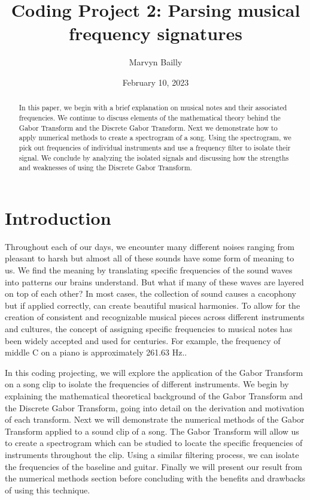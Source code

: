 \documentclass[12pt]{article}%
\begin{document}
\title{Coding Project 2:  Parsing musical frequency signatures}

\author{Marvyn Bailly}
\date{February 10, 2023}

\maketitle


\begin{abstract}
In this paper, we begin with a brief explanation on musical notes and their associated frequencies. We continue to discuss elements of the mathematical theory behind the Gabor Transform and the Discrete Gabor Transform. Next we demonstrate how to apply numerical methods to create a spectrogram of a song. Using the spectrogram, we pick out frequencies of individual instruments and use a frequency filter to isolate their signal. We conclude by analyzing the isolated signals and discussing how the strengths and weaknesses of using the Discrete Gabor Transform. 
\end{abstract}


\section{Introduction}
\label{Sec: Intro}

Throughout each of our days, we encounter many different noises ranging from pleasant to harsh but almost all of these sounds have some form of meaning to us. We find the meaning by translating specific frequencies of the sound waves into patterns our brains understand. But what if many of these waves are layered on top of each other? In most cases, the collection of sound causes a cacophony but if applied correctly, can create beautiful musical harmonies. To allow for the creation of consistent and recognizable musical pieces across different instruments and cultures, the concept of assigning specific frequencies to musical notes has been widely accepted and used for centuries. For example, the frequency of middle C on a piano is approximately 261.63 Hz.. 


\bigskip
\bigskip

In this coding projecting, we will explore the application of the Gabor Transform on a song clip to isolate the frequencies of different instruments. We begin by explaining the mathematical theoretical background of the Gabor Transform  and the Discrete Gabor Transform, going into detail on the derivation and motivation of each transform. Next we will demonstrate the numerical methods of the Gabor Transform applied to a sound clip of a song. The Gabor Transform will allow us to create a spectrogram which can be studied to locate the specific frequencies of instruments throughout the clip. Using a similar filtering process, we can isolate the frequencies of the baseline and guitar. Finally we will present our result from the numerical methods section before concluding with the benefits and drawbacks of using this technique.  
\end{document}

